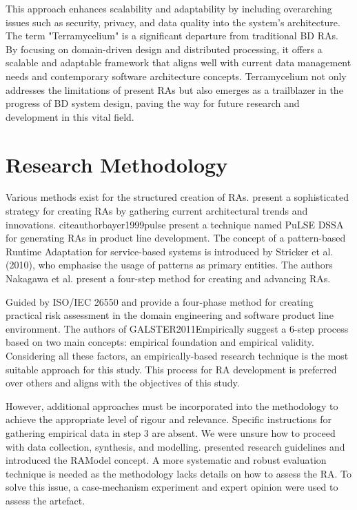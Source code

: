\documentclass[journal]{IEEEtran}
\begin{document}
This approach enhances scalability and adaptability by including overarching issues such as security, privacy, and data quality into the system's architecture. The term "Terramycelium" is a significant departure from traditional BD RAs. By focusing on domain-driven design and distributed processing, it offers a scalable and adaptable framework that aligns well with current data management needs and contemporary software architecture concepts. Terramycelium not only addresses the limitations of present RAs but also emerges as a trailblazer in the progress of BD system design, paving the way for future research and development in this vital field.

\section{Research Methodology}

Various methods exist for the structured creation of RAs. \cite{Cloutier2010} present a sophisticated strategy for creating RAs by gathering current architectural trends and innovations. citeauthorbayer1999pulse present a technique named PuLSE DSSA for generating RAs in product line development. The concept of a pattern-based Runtime Adaptation for service-based systems is introduced by Stricker et al. (2010), who emphasise the usage of patterns as primary entities. The authors Nakagawa et al. present a four-step method for creating and advancing RAs. 

Guided by ISO/IEC 26550 \cite{wg2015iso} and \cite{Derras} provide a four-phase method for creating practical risk assessment in the domain engineering and software product line environment. The authors of GALSTER2011Empirically suggest a 6-step process based on two main concepts: empirical foundation and empirical validity. Considering all these factors, an empirically-based research technique is the most suitable approach for this study. This process for RA development is preferred over others and aligns with the objectives of this study.

However, additional approaches must be incorporated into the methodology to achieve the appropriate level of rigour and relevance. Specific instructions for gathering empirical data in step 3 are absent. We were unsure how to proceed with data collection, synthesis, and modelling. \cite{Nakagawa} presented research guidelines and introduced the RAModel concept. A more systematic and robust evaluation technique is needed as the methodology lacks details on how to assess the RA. To solve this issue, a case-mechanism experiment and expert opinion were used to assess the artefact.
\end{document}
